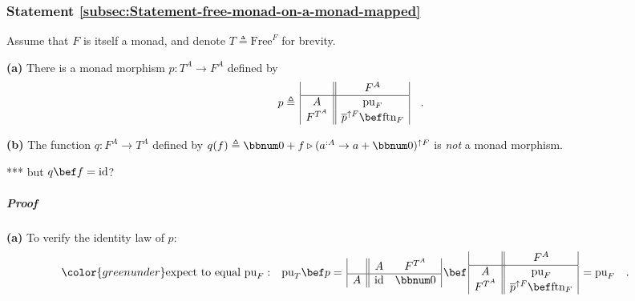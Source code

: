 \subsubsection{Statement \label{subsec:Statement-free-monad-on-a-monad-mapped}\ref{subsec:Statement-free-monad-on-a-monad-mapped}}

Assume that $F$ is itself a monad, and denote $T\triangleq\text{Free}^{F}$
for brevity.

\textbf{(a)} There is a monad morphism $p:T^{A}\rightarrow F^{A}$
defined by
\[
p\triangleq\,\begin{array}{|c||c|}
 & F^{A}\\
\hline A & \text{pu}_{F}\\
F^{T^{A}} & \overline{p}^{\uparrow F}\bef\text{ftn}_{F}
\end{array}\quad.
\]

\textbf{(b)} The function $q:F^{A}\rightarrow T^{A}$ defined by $q(f)\triangleq\bbnum 0+f\triangleright(a^{:A}\rightarrow a+\bbnum 0)^{\uparrow F}$
is \emph{not} a monad morphism.

{*}{*}{*} but $q\bef f=\text{id}$?

\subparagraph{Proof}

\textbf{(a)} To verify the identity law of $p$:
\begin{align*}
{\color{greenunder}\text{expect to equal }\text{pu}_{F}:}\quad & \text{pu}_{T}\bef p=\,\begin{array}{|c||cc|}
 & A & F^{T^{A}}\\
\hline A & \text{id} & \bbnum 0
\end{array}\,\bef\,\begin{array}{|c||c|}
 & F^{A}\\
\hline A & \text{pu}_{F}\\
F^{T^{A}} & \overline{p}^{\uparrow F}\bef\text{ftn}_{F}
\end{array}\,=\text{pu}_{F}\quad.
\end{align*}

